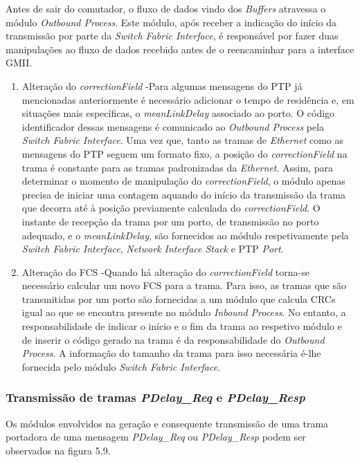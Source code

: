 Antes de sair do comutador, o fluxo de dados vindo dos \textit{Buffers} atravessa o módulo \textit{Outbound Process}. Este módulo, após receber a indicação do início da transmissão por parte da \textit{Switch Fabric Interface}, é responsável por fazer duas manipulações ao fluxo de dados recebido antes de o reencaminhar para a interface GMII. 

\begin{enumerate}
\item Alteração do \textit{correctionField} -\quad Para algumas mensagens do PTP já mencionadas anteriormente é necessário adicionar o tempo de residência e, em situações mais específicas, o \textit{meanLinkDelay} associado ao porto. O código identificador dessas mensagens é comunicado ao \textit{Outbound Process} pela \textit{Switch Fabric Interface}. Uma vez que, tanto as tramas de \textit{Ethernet} como as mensagens do PTP seguem um formato fixo, a posição do \textit{correctionField} na trama é constante para as tramas padronizadas da \textit{Ethernet}. Assim, para determinar o momento de manipulação do \textit{correctionField}, o módulo apenas precisa de iniciar uma contagem aquando do início da transmissão da trama que decorra até à posição previamente calculada do \textit{correctionField}. O instante de recepção da trama por um porto, de transmissão no porto adequado, e o \textit{meanLinkDelay}, são fornecidos ao módulo respetivamente pela \textit{Switch Fabric Interface}, \textit{Network Interface Stack} e PTP \textit{Port}.
\item Alteração do FCS -\quad Quando há alteração do \textit{correctionField} torna-se necessário calcular um novo FCS para a trama. Para isso, as tramas que são transmitidas por um porto são fornecidas a um módulo que calcula CRCs igual ao que se encontra presente no módulo \textit{Inbound Process}. No entanto, a responsabilidade de indicar o início e o fim da trama ao respetivo módulo e de inserir o código gerado na trama é da responsabilidade do \textit{Outbound Process}. A informação do tamanho da trama para isso necessária é-lhe fornecida pelo módulo \textit{Switch Fabric Interface}.
\end{enumerate}

\subsubsection{Transmissão de tramas \textit{PDelay\_Req} e \textit{PDelay\_Resp}}

Os módulos envolvidos na geração e consequente transmissão de uma trama portadora de uma mensagem \textit{PDelay\_Req} ou \textit{PDelay\_Resp} podem ser observados na figura 5.9.


